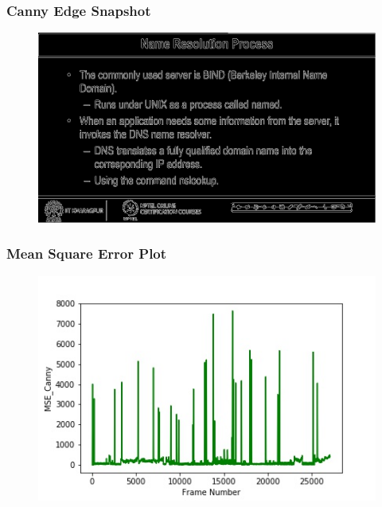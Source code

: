 \documentclass{beamer}
\begin{document}
\begin{frame}
\frametitle{Canny Edge Snapshot}
\begin{figure}[h!]
	\includegraphics[width=\linewidth]{Presentation_Image/Canny.jpg}
\end{figure}
\end{frame}



\begin{frame}
\frametitle{Mean Square Error Plot}
\begin{figure}[h!]
	\includegraphics[width=\linewidth]{Presentation_Image/MSE_Canny.jpeg}
\end{figure}
\end{frame}
\end{document}
